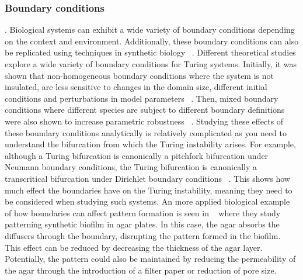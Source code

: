 \subsubsection{Boundary conditions}.
Biological systems can exhibit a wide variety of boundary conditions depending on the context and environment.
Additionally, these boundary conditions can also be replicated using techniques in synthetic biology ~\parencite{Krause2020, Sheth2012, Vahey2014}.
Different theoretical studies explore a wide variety of boundary conditions for Turing systems.
Initially, it was shown that non-homogeneous boundary conditions where the system is not insulated, are less sensitive to changes in the domain size, different initial conditions and perturbations in model parameters ~\parencite{Arcuri1986}.
Then, mixed boundary conditions where different species are subject to different boundary definitions were also shown to increase parametric robustness ~\parencite{Maini1993, Maini1997, Krause2021}.
Studying these effects of these boundary conditions analytically is relatively complicated as you need to understand the bifurcation from which the Turing instability arises.
For example, although a Turing bifurcation is canonically a pitchfork bifurcation under Neumann boundary conditions, the Turing bifurcation is canonically a transcritical bifurcation under Dirichlet boundary conditions ~\parencite{Woolley2022}. %
This shows how much effect the boundaries have on the Turing instability, meaning they need to be considered when studying such systems.
An more applied biological example of how boundaries can affect pattern formation is seen in ~\parencite{Krause2020} where they study patterning synthetic biofilm in agar plates.
In this case, the agar absorbs the diffusers through the boundary, disrupting the pattern formed in the biofilm.
This effect can be reduced by decreasing the thickness of the agar layer.
Potentially, the pattern could also be maintained by reducing the permeability of the agar through the introduction of a filter paper or reduction of pore size.


%






